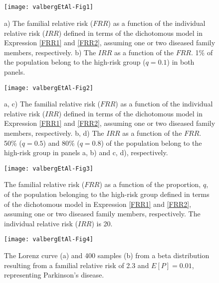\documentclass{bmcart}
\begin{document}
\begin{backmatter}

\section*{}


\begin{landscape}
\begin{figure}[]
 	\centering
  	\texttt{[image: valbergEtAl-Fig1]}
 	\caption{a) The familial relative risk ($FRR$) as a function of the individual relative risk ($IRR$) defined in terms of the dichotomous model in Expression \eqref{FRR1} and \eqref{FRR2}, assuming one or two diseased family members, respectively. b) The $IRR$ as a function of the $FRR$. 1\% of the population belong to the high-risk group ($q=0.1$) in both panels.}
 	 \label{FRRq=0.01}
\end{figure}
\end{landscape}

\begin{landscape}
\begin{figure}[]
 	\centering
	\texttt{[image: valbergEtAl-Fig2]}
 	\caption{a, c) The familial relative risk ($FRR$) as a function of the individual relative risk ($IRR$) defined in terms of the dichotomous model in Expression \eqref{FRR1} and \eqref{FRR2}, assuming one or two diseased family members, respectively. b, d) The $IRR$ as a function of the $FRR$. 50\% ($q=0.5$) and 80\% ($q=0.8$) of the population belong to the high-risk group in panels a, b) and c, d), respectively.}
 	 \label{FRRq=0.5and0.8}
\end{figure}
\end{landscape}

\begin{figure}[]
 	\centering
  	\texttt{[image: valbergEtAl-Fig3]}
 	\caption{The familial relative risk ($FRR$) as a function of the proportion, $q$, of the population belonging to the high-risk group defined in terms of the dichotomous model in Expression \eqref{FRR1} and \eqref{FRR2}, assuming one or two diseased family members, respectively. The individual relative risk ($IRR$) is 20.}
 	 \label{FRRirr=20}
\end{figure}



\begin{landscape}
\begin{figure}[]
 	\centering
	\texttt{[image: valbergEtAl-Fig4]}
 	\caption{The Lorenz curve (a) and 400 samples (b) from a beta distribution resulting from a familial relative risk of 2.3 and $E[P]=0.01$, representing Parkinson's disease.}%
 	 \label{lorentz}
\end{figure}
\end{landscape}


\end{backmatter}
\end{document}
